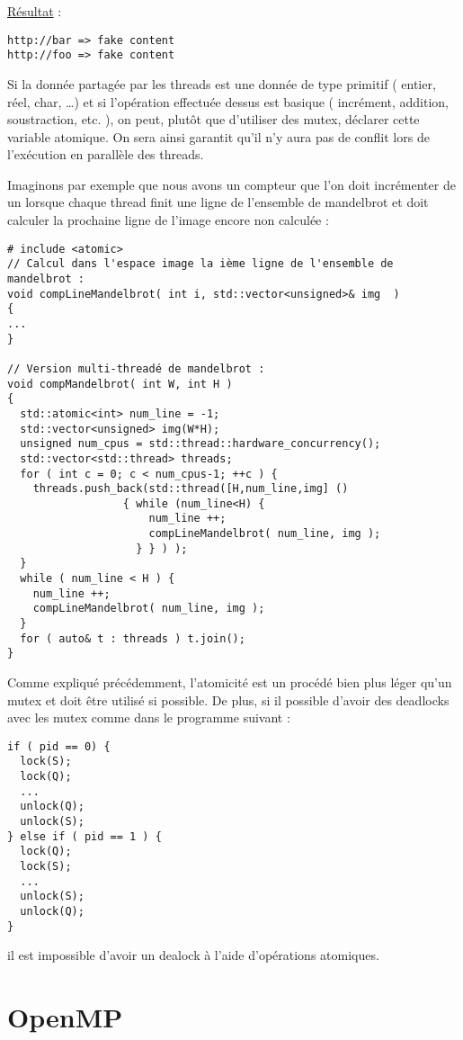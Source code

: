 \documentclass[fleqn,11pt]{article}
\begin{document}
\underline{Résultat} :

\begin{verbatim}
http://bar => fake content
http://foo => fake content
\end{verbatim}

Si la donnée partagée par les threads est une donnée de type primitif ( entier, réel, char, \ldots ) et si l'opération
effectuée dessus est basique ( incrément, addition, soustraction, etc. ), on peut, plutôt que d'utiliser des mutex, déclarer
cette variable atomique. On sera ainsi garantit qu'il n'y aura pas de conflit lors de l'exécution en parallèle des threads.

Imaginons par exemple que nous avons un compteur que l'on doit incrémenter de un lorsque chaque thread finit une ligne de l'ensemble de mandelbrot
et doit calculer la prochaine ligne de l'image encore non calculée :

\begin{lstlisting}
# include <atomic>
// Calcul dans l'espace image la ième ligne de l'ensemble de mandelbrot :
void compLineMandelbrot( int i, std::vector<unsigned>& img  )
{
...
}

// Version multi-threadé de mandelbrot :
void compMandelbrot( int W, int H )
{
  std::atomic<int> num_line = -1;
  std::vector<unsigned> img(W*H);
  unsigned num_cpus = std::thread::hardware_concurrency();
  std::vector<std::thread> threads;
  for ( int c = 0; c < num_cpus-1; ++c ) {
    threads.push_back(std::thread([H,num_line,img] () 
				  { while (num_line<H) { 
				      num_line ++;
				      compLineMandelbrot( num_line, img );
				    } } ) );
  }
  while ( num_line < H ) {
    num_line ++;
    compLineMandelbrot( num_line, img );
  }
  for ( auto& t : threads ) t.join();
}
\end{lstlisting}

Comme expliqué précédemment, l'atomicité est un procédé bien plus léger qu'un mutex et doit être utilisé si possible.
De plus, si il possible d'avoir des deadlocks avec les mutex comme dans le programme suivant :
\begin{lstlisting}
if ( pid == 0) {
  lock(S);
  lock(Q);
  ...
  unlock(Q);
  unlock(S);
} else if ( pid == 1 ) {
  lock(Q);
  lock(S);
  ...
  unlock(S);
  unlock(Q);
}
\end{lstlisting}

il est impossible d'avoir un dealock à l'aide d'opérations atomiques.

\section{OpenMP}
\end{document}
